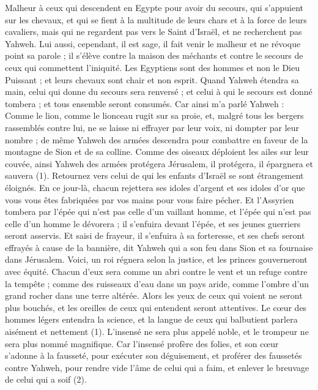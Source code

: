 \begin{multicols}{2}
\VerseOne{}Malheur à ceux qui descendent en Egypte pour avoir du secours, qui s'appuient sur les chevaux, et qui se fient à la multitude de leurs chars et à la force de leurs cavaliers, mais qui ne regardent pas vers le Saint d'Israël, et ne recherchent pas Yahweh.
Lui aussi, cependant, il est sage, il fait venir le malheur et ne révoque point sa parole ; il s'élève contre la maison des méchants et contre le secours de ceux qui commettent l’iniquité.
Les Egyptiens sont des hommes et non le Dieu Puissant ; et leurs chevaux sont chair et non esprit. Quand Yahweh étendra sa main, celui qui donne du secours sera renversé ; et celui à qui le secours est donné tombera ; et tous ensemble seront consumés.
Car ainsi m'a parlé Yahweh : Comme le lion, comme le lionceau rugit sur sa proie, et, malgré tous les bergers rassemblés contre lui, ne se laisse ni effrayer par leur voix, ni dompter par leur nombre ; de même Yahweh des armées descendra pour combattre en faveur de la montagne de Sion et de sa colline.
Comme des oiseaux déploient les ailes sur leur couvée, ainsi Yahweh des armées protégera Jérusalem, il protégera, il épargnera et sauvera (1).
Retournez vers celui de qui les enfants d'Israël se sont étrangement éloignés.
En ce jour-là, chacun rejettera ses idoles d’argent et ses idoles d’or que vous vous êtes fabriquées par vos mains pour vous faire pécher.
Et l'Assyrien tombera par l'épée qui n’est pas celle d'un vaillant homme, et l'épée qui n'est pas celle d’un homme le dévorera ; il s'enfuira devant l'épée, et ses jeunes guerriers seront asservis.
Et saisi de frayeur, il s’enfuira à sa forteresse, et ses chefs seront effrayés à cause de la bannière, dit Yahweh qui a son feu dans Sion et sa fournaise dans Jérusalem.
\VerseOne{}Voici, un roi régnera selon la justice, et les princes gouverneront avec équité.
Chacun d’eux sera comme un abri contre le vent et un refuge contre la tempête ; comme des ruisseaux d'eau dans un pays aride, comme l'ombre d'un grand rocher dans une terre altérée.
Alors les yeux de ceux qui voient ne seront plus bouchés, et les oreilles de ceux qui entendent seront attentives.
Le cœur des hommes légers entendra la science, et la langue de ceux qui balbutient parlera aisément et nettement (1).
L’insensé ne sera plus appelé noble, et le trompeur ne sera plus nommé magnifique.
Car l’insensé profère des folies, et son cœur s’adonne à la fausseté, pour exécuter son déguisement, et proférer des faussetés contre Yahweh, pour rendre vide l'âme de celui qui a faim, et enlever le breuvage de celui qui a soif (2).

\end{multicols}

